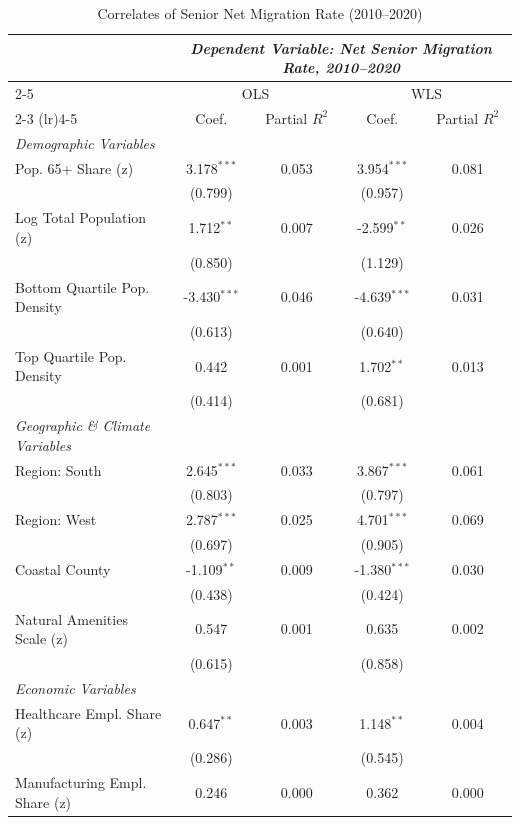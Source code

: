 \begin{table}[htbp!]
\centering
\caption{Correlates of Senior Net Migration Rate (2010--2020)}
\label{tab:netmig_regression}
\begin{tabular}{lcccc}
\hline\hline
 & \multicolumn{4}{c}{\textit{Dependent Variable: Net Senior Migration Rate, 2010--2020}} \\
\cmidrule(lr){2-5}
 & \multicolumn{2}{c}{OLS} & \multicolumn{2}{c}{WLS} \\
\cmidrule(lr){2-3} \cmidrule(lr){4-5}
 & Coef. & Partial $R^2$ & Coef. & Partial $R^2$ \\
\hline
\textit{Demographic Variables} & & & & \\
\quad Pop. 65+ Share (z) & 3.178$^{***}$ & 0.053 & 3.954$^{***}$ & 0.081 \\
 & (0.799) & & (0.957) & \\
\quad Log Total Population (z) & 1.712$^{**}$ & 0.007 & -2.599$^{**}$ & 0.026 \\
 & (0.850) & & (1.129) & \\
\quad Bottom Quartile Pop. Density & -3.430$^{***}$ & 0.046 & -4.639$^{***}$ & 0.031 \\
 & (0.613) & & (0.640) & \\
\quad Top Quartile Pop. Density & 0.442 & 0.001 & 1.702$^{**}$ & 0.013 \\
 & (0.414) & & (0.681) & \\
[3pt]
\textit{Geographic \& Climate Variables} & & & & \\
\quad Region: South & 2.645$^{***}$ & 0.033 & 3.867$^{***}$ & 0.061 \\
 & (0.803) & & (0.797) & \\
\quad Region: West & 2.787$^{***}$ & 0.025 & 4.701$^{***}$ & 0.069 \\
 & (0.697) & & (0.905) & \\
\quad Coastal County & -1.109$^{**}$ & 0.009 & -1.380$^{***}$ & 0.030 \\
 & (0.438) & & (0.424) & \\
\quad Natural Amenities Scale (z) & 0.547 & 0.001 & 0.635 & 0.002 \\
 & (0.615) & & (0.858) & \\
[3pt]
\textit{Economic Variables} & & & & \\
\quad Healthcare Empl. Share (z) & 0.647$^{**}$ & 0.003 & 1.148$^{**}$ & 0.004 \\
 & (0.286) & & (0.545) & \\
\quad Manufacturing Empl. Share (z) & 0.246 & 0.000 & 0.362 & 0.000 \\

\end{tabular}
\end{table}
